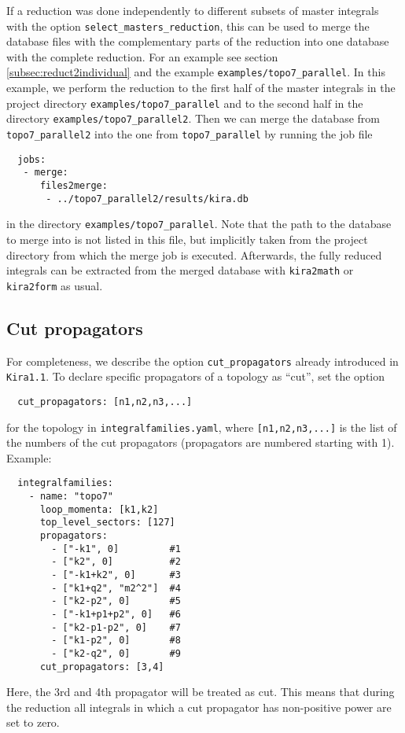 \documentclass[a4paper,12pt]{article}
\newcommand*{\kira}{\texttt{Kira}}
\begin{document}
If a reduction was done independently to different subsets of master integrals
with the option \texttt{select\_masters\_reduction}, this can be used to merge
the database files with the complementary parts of the reduction into one
database with the complete reduction.
For an example see section \ref{subsec:reduct2individual} and the example
\texttt{examples/topo7\_parallel}.
In this example, we perform the reduction to the first half of the master
integrals in the project directory \texttt{examples/topo7\_parallel} and to the
second half in the directory \texttt{examples/topo7\_parallel2}.
Then we can merge the database from \texttt{topo7\_parallel2} into the one from
\texttt{topo7\_parallel} by running the job file
\begin{verbatim}
  jobs:
   - merge:
      files2merge:
       - ../topo7_parallel2/results/kira.db
\end{verbatim}
in the directory \texttt{examples/topo7\_parallel}.
Note that the path to the database to merge into is not listed in this file, but
implicitly taken from the project directory from which the merge job is
executed.
Afterwards, the fully reduced integrals can be extracted from the merged
database with \texttt{kira2math} or \texttt{kira2form} as usual.


\subsection{Cut propagators}

For completeness, we describe the option \texttt{cut\_propagators} already
introduced in \kira{}\;\texttt{1.1}.
To declare specific propagators of a topology as ``cut'', set the option
\begin{verbatim}
  cut_propagators: [n1,n2,n3,...]
\end{verbatim}
for the topology in \texttt{integralfamilies.yaml}, where
\texttt{[n1,n2,n3,...]} is the list of the numbers of the cut propagators
(propagators are numbered starting with 1). Example:
\begin{verbatim}
  integralfamilies:
    - name: "topo7"
      loop_momenta: [k1,k2]
      top_level_sectors: [127]
      propagators:
        - ["-k1", 0]         #1
        - ["k2", 0]          #2
        - ["-k1+k2", 0]      #3
        - ["k1+q2", "m2^2"]  #4
        - ["k2-p2", 0]       #5
        - ["-k1+p1+p2", 0]   #6
        - ["k2-p1-p2", 0]    #7
        - ["k1-p2", 0]       #8
        - ["k2-q2", 0]       #9
      cut_propagators: [3,4]
\end{verbatim}
Here, the 3rd and 4th propagator will be treated as cut. This means that during
the reduction all integrals in which a cut propagator has non-positive power are
set to zero.
\end{document}
